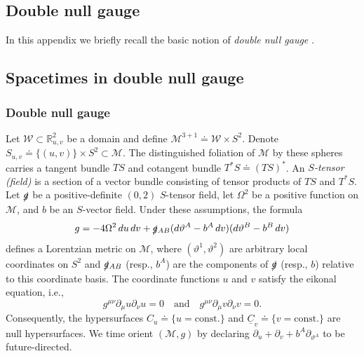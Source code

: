 \documentclass[10pt]{article}
\numberwithin{equation}{section}
\theoremstyle{plain}
\theoremstyle{definition}
\renewcommand{\Bbb}{\mathbb}
\begin{document}
\begin{appendix}
\section{Double null gauge} \label{app:A}

In this appendix we briefly recall the basic notion of \emph{double null gauge} \cite{double-null, Christo09}.

\subsection{Spacetimes in double null gauge}

\subsubsection{Double null gauge} 

Let $\mathcal W\subset \Bbb R^2_{u,v}$ be a domain and define $\mathcal M^{3+1}\doteq \mathcal W\times S^2$. Denote $S_{u,v}\doteq\{(u,v)\}\times S^2\subset \mathcal M$. The distinguished foliation of $\mathcal M$ by these spheres carries a tangent bundle $TS $ and cotangent bundle $T^*S\doteq(TS)^*$. An \emph{$S$-tensor (field)} is a section of a vector bundle consisting of tensor products of $TS$ and $T^*S$. Let $\slashed g$ be a positive-definite $(0,2)$ $S$-tensor field, let $\Omega^2$ be a positive function on $\mathcal M$, and $b$ be an $S$-vector field. Under these assumptions, the formula
\begin{equation*}
    g= -4\Omega^2\,du\,dv + \slashed g{}_{AB}(d\vartheta^A-b^A\,dv)(d\vartheta^B-b^B\,dv)
\end{equation*}
defines a Lorentzian metric on $\mathcal M$, where $(\vartheta^1,\vartheta^2)$ are arbitrary local coordinates on $S^2$ and $\slashed g{}_{AB}$ (resp., $b^A$) are the components of $\slashed g$ (resp., $b$) relative to this coordinate basis. The coordinate functions $u$ and $v$ satisfy the eikonal equation, i.e.,
\begin{equation}
    g^{\mu\nu}\partial_\mu u\partial_\nu u=0\quad\text{and}\quad g^{\mu\nu}\partial_\mu v \partial_\nu v=0.\nonumber
\end{equation}
Consequently, the hypersurfaces $C_u\doteq\{u=\mathrm{const.}\}$ and $\underline C_v\doteq \{v=\mathrm{const.}\}$ are null hypersurfaces. We time orient $(\mathcal M,g)$ by declaring $\partial_u+\partial_v+b^A\partial_{\vartheta^A}$ to be future-directed. 


\end{appendix}
\end{document}
